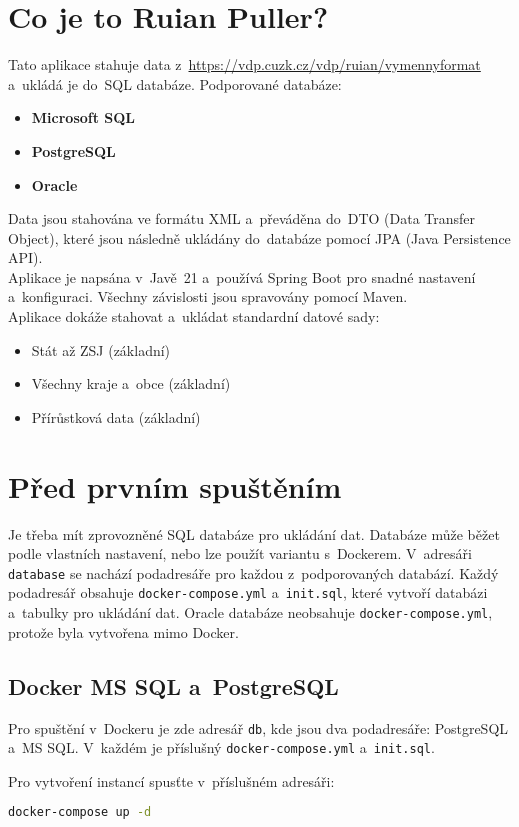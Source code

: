 \section*{Co je to Ruian Puller?}
Tato aplikace stahuje data z~\url{https://vdp.cuzk.cz/vdp/ruian/vymennyformat} a~ukládá je do~SQL databáze.
Podporované databáze:
\begin{itemize}
  \item \textbf{Microsoft SQL}
  \item \textbf{PostgreSQL}
  \item \textbf{Oracle}
\end{itemize}

Data jsou stahována ve formátu XML a~převáděna do~DTO (Data Transfer Object), které jsou následně ukládány do~databáze pomocí JPA (Java Persistence API).\\
Aplikace je napsána v~Javě~21 a~používá Spring Boot pro snadné nastavení a~konfiguraci. Všechny závislosti jsou spravovány pomocí Maven.\\
Aplikace dokáže stahovat a~ukládat standardní datové sady:
\begin{itemize}
  \item Stát až ZSJ (základní)
  \item Všechny kraje a~obce (základní)
  \item Přírůstková data (základní)
\end{itemize}

\section*{Před prvním spuštěním}
Je třeba mít zprovozněné SQL databáze pro ukládání dat. Databáze může běžet podle vlastních nastavení, nebo lze použít variantu s~Dockerem.
V~adresáři \texttt{database} se nachází podadresáře pro každou z~podporovaných databází. Každý podadresář obsahuje \texttt{docker-compose.yml} a~\texttt{init.sql},
které vytvoří databázi a~tabulky pro ukládání dat.
Oracle databáze neobsahuje \texttt{docker-compose.yml}, protože byla vytvořena mimo Docker.

\subsection*{Docker MS SQL a~PostgreSQL}
Pro spuštění v~Dockeru je zde adresář \texttt{db}, kde jsou dva podadresáře: PostgreSQL a~MS SQL. V~každém je příslušný \texttt{docker-compose.yml} a~\texttt{init.sql}.

Pro vytvoření instancí spusťte v~příslušném adresáři:
\begin{lstlisting}[language=bash]
docker-compose up -d
\end{lstlisting}

